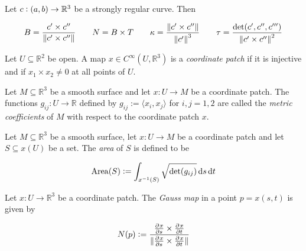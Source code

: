 \vspace{1mm}

\begin{lemma}
	Let $c: \intoo{a,b} \to \mathbb{R}^3$ be a strongly regular curve. Then

	\begin{equation}
		B = \frac{c' \times c''}{\norm[0]{c' \times c''}} \qquad N = B \times T \qquad \kappa = \frac{\norm[0]{c' \times c''}}{\norm[0]{c'}^3} \qquad \tau = \frac{\det(c',c'',c''')}{\norm[0]{c' \times c''}^2}
	\end{equation}
\end{lemma}

\vspace{1mm}

\begin{definition}
	Let $U \subseteq \mathbb{R}^2$ be open. A map $x \in C^\infty(U, \mathbb{R}^3)$ is a \emph{coordinate patch} if it is injective and if $x_1 \times x_2 \neq 0$ at all points of $U$. 
\end{definition}

\vspace{1mm}

\begin{definition}
	Let $M \subseteq \mathbb{R}^3$ be a smooth surface and let $x: U \to M$ be a coordinate patch. The functions $g_{ij}: U \to \mathbb{R}$ defined by $g_{ij} := \langle x_i,x_j\rangle$ for $i,j = 1,2$ are called the \emph{metric coefficients} of $M$ with respect to the coordinate patch $x$.
\end{definition}

\vspace{1mm}

\begin{definition}
	Let $M \subseteq \mathbb{R}^3$ be a smooth surface, let $x: U \to M$ be a coordinate patch and let $S \subseteq x(U)$ be a set. The \emph{area} of $S$ is defined to be

	\begin{equation}
		\operatorname{Area}(S) := \int_{x^{-1}(S)} \sqrt{\det(g_{ij})} \mathop{}\!\mathrm{d} s \mathop{}\!\mathrm{d} t
	\end{equation}
\end{definition}

\vspace{1mm}

Let $x: U \to \mathbb{R}^3$ be a coordinate patch. The \emph{Gauss map} in a point $p = x(s,t)$ is given by 

\begin{equation}
	N(p) := \frac{\pd{x}{s} \times \pd{x}{t}}{\norm[0]{\pd{x}{s} \times \pd{x}{t}}} 
\end{equation}


